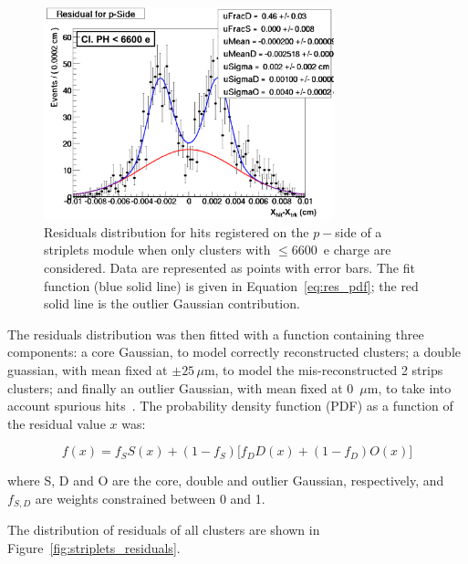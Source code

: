 \begin{figure}
\centering
\includegraphics[width=0.75\textwidth]{annotated_res_pside_1stPHbin.pdf}
\caption{\label{fig:annotated_res_pside_1stPHbin}Residuals distribution for hits registered on the $p-$side of a 
striplets module when only clusters with $\le$6600~e charge are considered. Data are represented as points with error bars. The fit function (blue solid line) is given in Equation~\ref{eq:res_pdf}; the red solid line 
is the outlier Gaussian contribution.}
\end{figure}

The residuals distribution was then fitted with a function containing three components: a core 
Gaussian, to model correctly reconstructed clusters; a double guassian, with mean fixed at 
$\pm 25\, \mu$m, to model the mis-reconstructed 2 strips clusters; and finally an outlier Gaussian, 
with mean fixed at 0~$\mu$m, to take into account spurious hits~\cite{BOMBEN2010159}. 
The probability density function (PDF) as a function of the residual value $x$ was:

\begin{equation}
f(x)=f_S S(x)+(1-f_S)\Big[  f_DD(x)+(1-f_D)O(x) \Big]
\label{eq:res_pdf}
\end{equation}

where S, D and O are the core, double and outlier Gaussian, respectively, and $f_{S,D}$ are 
weights constrained between 0 and 1. 

The distribution of residuals of all clusters are shown in Figure~\ref{fig:striplets_residuals}. 

